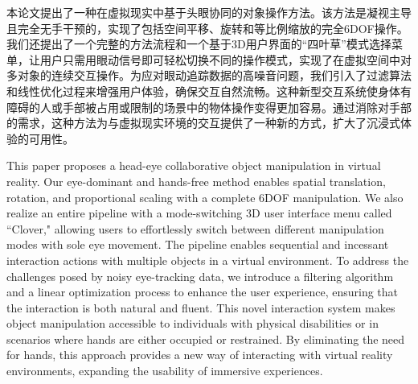 
\begin{cabstract}
本论文提出了一种在虚拟现实中基于头眼协同的对象操作方法。该方法是凝视主导且完全无手干预的，实现了包括空间平移、旋转和等比例缩放的完全6DOF操作。我们还提出了一个完整的方法流程和一个基于3D用户界面的“四叶草”模式选择菜单，让用户只需用眼动信号即可轻松切换不同的操作模式，实现了在虚拟空间中对多对象的连续交互操作。为应对眼动追踪数据的高噪音问题，我们引入了过滤算法和线性优化过程来增强用户体验，确保交互自然流畅。这种新型交互系统使身体有障碍的人或手部被占用或限制的场景中的物体操作变得更加容易。通过消除对手部的需求，这种方法为与虚拟现实环境的交互提供了一种新的方式，扩大了沉浸式体验的可用性。
\end{cabstract}

\begin{eabstract}
This paper proposes a head-eye collaborative object manipulation in virtual reality. Our eye-dominant and hands-free method enables spatial translation, rotation, and proportional scaling with a complete 6DOF manipulation. We also realize an entire pipeline with a mode-switching 3D user interface menu called ``Clover," allowing users to effortlessly switch between different manipulation modes with sole eye movement. The pipeline enables sequential and incessant interaction actions with multiple objects in a virtual environment. To address the challenges posed by noisy eye-tracking data, we introduce a filtering algorithm and a linear optimization process to enhance the user experience, ensuring that the interaction is both natural and fluent. This novel interaction system makes object manipulation accessible to individuals with physical disabilities or in scenarios where hands are either occupied or restrained. By eliminating the need for hands, this approach provides a new way of interacting with virtual reality environments, expanding the usability of immersive experiences.
\end{eabstract}